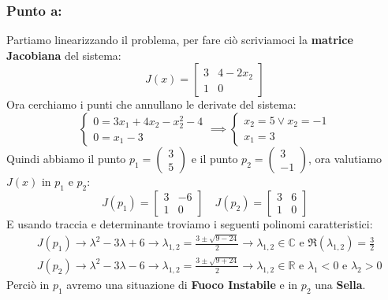 \documentclass[a4paper]{report}
\newcommand{\R}{\mathbb{R}}%
\begin{document}
\subsubsection*{Punto a:}
Partiamo linearizzando il problema, per fare ciò scriviamoci la \textbf{matrice Jacobiana} del sistema:
\[
J(x)=\begin{bmatrix}
3 & 4-2x_2\\
1 & 0
\end{bmatrix}
\]
Ora cerchiamo i punti che annullano le derivate del sistema:
\[
\left\{\begin{array}{l}
0=3x_1+4x_2-x_2^2-4\\
0=x_1-3
\end{array}
\right.\implies\left\{\begin{array}{l}
x_2=5 \lor x_2=-1\\
x_1=3
\end{array}
\right.
\]
Quindi abbiamo il punto $p_1=\left(\begin{array}{c}
3\\
5
\end{array}\right)$ e il punto $p_2=\left(\begin{array}{r}
3\\
-1
\end{array}\right)$, ora valutiamo $J(x)$ in $p_1$ e $p_2$:
\[
J(p_1)=\begin{bmatrix}
3 & -6\\
1 & 0
\end{bmatrix} \quad J(p_2)=\begin{bmatrix}
3 & 6\\
1 & 0
\end{bmatrix}
\]
E usando  traccia e determinante troviamo i seguenti polinomi caratteristici:
\begin{align*}
&J(p_1)\longrightarrow \lambda^2-3\lambda+6\longrightarrow \lambda_{1,2}=\frac{3\pm\sqrt{9-24}}{2}\longrightarrow \lambda_{1,2}\in\mathbb{C} \text{ e }\Re(\lambda_{1,2})=\frac{3}{2}\\
&J(p_2)\longrightarrow \lambda^2-3\lambda-6\longrightarrow \lambda_{1,2}=\frac{3\pm\sqrt{9+24}}{2}\longrightarrow \lambda_{1,2}\in\R \text{ e } \lambda_1<0 \text{ e } \lambda_2>0
\end{align*}
Perciò in $p_1$ avremo una situazione di \textbf{Fuoco Instabile} e in $p_2$ una \textbf{Sella}.\newpage
\end{document}
